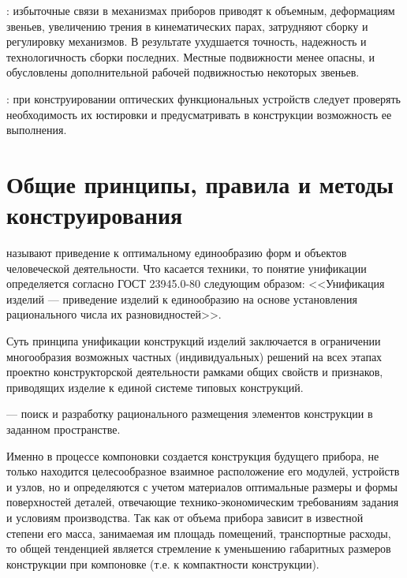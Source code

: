: избыточные связи в механизмах приборов приводят к объемным, деформациям звеньев, увеличению трения в кинематических парах, затрудняют сборку и регулировку механизмов. 
В результате ухудшается точность, надежность и технологичность сборки последних. 
Местные подвижности менее опасны, и обусловлены дополнительной рабочей подвижностью некоторых звеньев.

: при конструировании оптических функциональных устройств следует проверять необходимость их юстировки и предусматривать в конструкции возможность ее выполнения.

\section{Общие принципы, правила и методы конструирования}

 называют приведение к оптимальному единообразию форм и объектов человеческой деятельности.
Что касается техники, то понятие унификации определяется согласно ГОСТ 23945.0-80 следующим образом: <<Унификация изделий --- приведение изделий к единообразию на основе установления рационального числа их разновидностей>>.

Суть принципа унификации конструкций изделий заключается в ограничении многообразия возможных частных (индивидуальных) решений на всех этапах проектно конструкторской деятельности рамками общих свойств и признаков, приводящих изделие к единой системе типовых конструкций.

 --- поиск и разработку рационального размещения элементов конструкции в заданном пространстве.

Именно в процессе компоновки создается конструкция будущего прибора, не только находится целесообразное взаимное расположение его модулей, устройств и узлов, но и определяются с учетом материалов оптимальные размеры и формы поверхностей деталей, отвечающие технико-экономическим требованиям задания и условиям производства. 
Так как от объема прибора зависит в известной степени его масса, занимаемая им площадь помещений, транспортные расходы, то общей тенденцией является стремление к уменьшению габаритных размеров конструкции при компоновке (т.е. к компактности конструкции).

